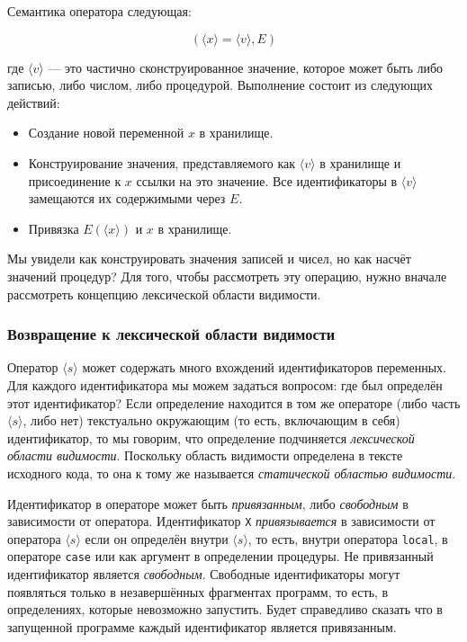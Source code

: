 Семантика оператора следующая:

$$(\langle x \rangle = \langle v \rangle,E)$$

где $\langle v \rangle$ --- это частично сконструированное значение, которое может быть либо записью, либо числом, либо процедурой. Выполнение состоит из следующих действий:

\begin{itemize}
\item{Создание новой переменной $x$ в хранилище.}

\item{Конструирование значения, представляемого как $\langle v \rangle$ в хранилище и присоединение к $x$ ссылки на это значение. Все идентификаторы в $\langle v \rangle$ замещаются их содержимыми через $E$.}

\item{Привязка $E(\langle x \rangle)$ и $x$ в хранилище.}
\end{itemize}

Мы увидели как конструировать значения записей и чисел, но как насчёт значений процедур? Для того, чтобы рассмотреть эту операцию, нужно вначале рассмотреть концепцию лексической области видимости.

\subsubsection{Возвращение к лексической области видимости}

Оператор $\langle s \rangle$ может содержать много вхождений идентификаторов переменных. Для каждого идентификатора мы можем задаться вопросом: где был определён этот идентификатор? Если определение находится в том же операторе (либо часть $\langle s \rangle$, либо нет) текстуально окружающим (то есть, включающим в себя) идентификатор, то мы говорим, что определение подчиняется \emph{лексической области видимости}. Поскольку область видимости определена в тексте исходного кода, то она к тому же называется \emph{статической областью видимости}.

Идентификатор в операторе может быть \emph{привязанным}, либо \emph{свободным} в зависимости от оператора. Идентификатор \lstinline|X| \emph{привязывается} в зависимости от оператора $\langle s \rangle$ если он определён внутри $\langle s \rangle$, то есть, внутри оператора \lstinline|local|, в операторе \lstinline|case| или как аргумент в определении процедуры. Не привязанный идентификатор является \emph{свободным}. Свободные идентификаторы могут появляться только в незавершённых фрагментах программ, то есть, в определениях, которые невозможно запустить. Будет справедливо сказать что в запущенной программе каждый идентификатор является привязанным.

